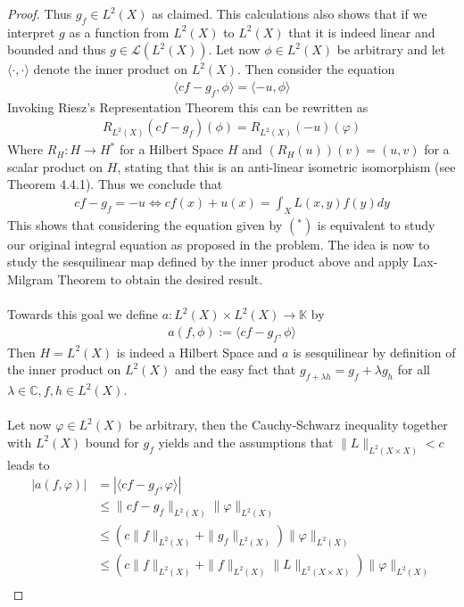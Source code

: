 \documentclass[12pt,a4paper]{article}
\begin{document}
\begin{proof}
Thus $g_f \in L^2(X)$ as claimed. This calculations also shows that if we interpret $g$ as a function from $L^2(X)$ to $L^2(X)$ that it is indeed linear and bounded and thus $g \in \mathcal{L}(L^2(X))$.
\newpage
Let now $\phi \in L^2(X)$ be arbitrary and let $\langle \cdot ,  \cdot \rangle$ denote the inner product on $L^2(X)$. Then consider the equation 
\begin{align*}
\langle cf -g_f, \phi \rangle = \langle -u , \phi \rangle  \tag{*}
\end{align*}
Invoking Riesz's Representation Theorem this can be rewritten as
\begin{align*}
R_{L^2(X)}(cf-g_f)( \phi) = R_{L^2(X)}(-u) (\varphi)
\end{align*}
Where $R_H : H \to H^*$ for a Hilbert Space $H$ and $(R_H(u))(v)=(u,v)$ for a scalar product on $H$, stating that this is an anti-linear isometric isomorphism (see Theorem 4.4.1). Thus we conclude that
\begin{align*}
cf-g_f=-u \iff cf(x) + u(x) = \int_X L(x,y)f(y)dy 
\end{align*}
This shows that considering the equation given by $(^*)$ is equivalent to study our original integral equation as proposed in the problem. The idea is now to study the sesquilinear map defined by the inner product above and apply Lax-Milgram Theorem to obtain the desired result. \\
\\
Towards this goal we define $a: L^2(X) \times L^2(X) \to \mathbb{K}$ by 
\begin{align*}
a(f, \phi) := \langle cf - g_f, \phi \rangle 
\end{align*}
Then $H=L^2(X)$ is indeed a Hilbert Space and $a$ is sesquilinear by definition of the inner product on $L^2(X)$ and the easy fact that $g_{f + \lambda h} = g_f + \lambda g_h$ for all $\lambda \in \mathbb{C}, f,h \in L^2(X)$.
\\\\
Let now $\varphi \in L^2(X)$ be arbitrary,  then the Cauchy-Schwarz inequality together with $L^2(X)$ bound for $g_f$ yields and the assumptions that $\|L\|_{L^2(X \times X)}<c$ leads to
\begin{align*}
|a(f, \varphi)| &= | \langle cf - g_f, \varphi \rangle | \\
& \leq \| cf-g_f \|_{L^2(X)} \| \varphi \|_{L^2(X)}  \\
& \leq ( c \| f \| _{L^2(X)} + \| g_f \|_{L^2(X)}) \| \varphi \|_{L^2(X)} \\
& \leq (c \|f \|_{L^2(X)} + \|f \|_{L^2(X)} \|L\|_{L^2( X \times X)} ) \| \varphi \|_{L^2(X)}  \\

\end{align*}
\end{proof}
\end{document}
